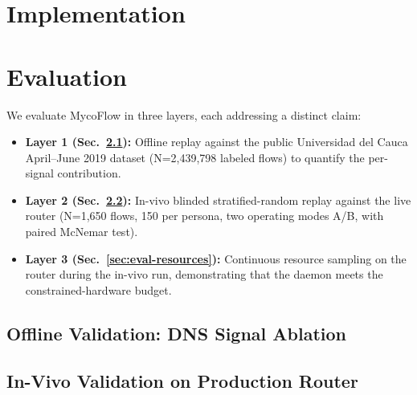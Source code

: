 \documentclass[journal,onecolumn]{IEEEtran}
\begin{document}
\section{Implementation}
\label{sec:impl}


\section{Evaluation}
\label{sec:eval}

We evaluate MycoFlow in three layers, each addressing a distinct claim:

\begin{itemize}
\item \textbf{Layer 1 (Sec.~\ref{sec:eval-offline}):} Offline replay
against the public Universidad del Cauca April--June 2019 dataset
(N=2,439,798 labeled flows) to quantify the per-signal contribution.
\item \textbf{Layer 2 (Sec.~\ref{sec:eval-invivo}):} In-vivo blinded
stratified-random replay against the live router (N=1,650 flows,
150 per persona, two operating modes A/B, with paired McNemar test).
\item \textbf{Layer 3 (Sec.~\ref{sec:eval-resources}):} Continuous resource
sampling on the router during the in-vivo run, demonstrating that the
daemon meets the constrained-hardware budget.
\end{itemize}

\subsection{Offline Validation: DNS Signal Ablation}
\label{sec:eval-offline}



\subsection{In-Vivo Validation on Production Router}
\label{sec:eval-invivo}
\end{document}
